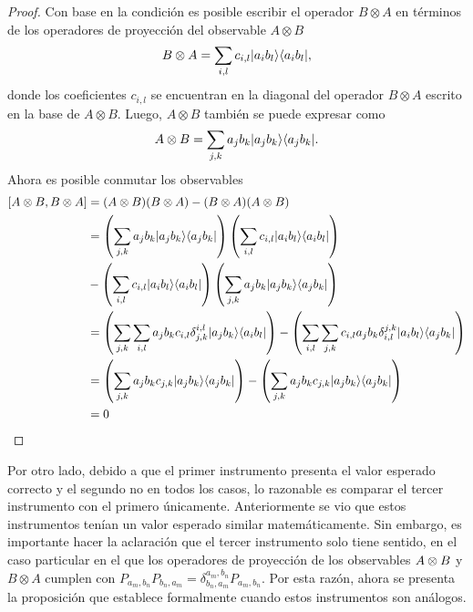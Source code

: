 \begin{proof}
    Con base en la condición es posible escribir el operador $B\otimes A$  en términos de los operadores de proyección del observable $A\otimes B$ \[ B\otimes A = \sum_{i,l} c_{i,l} |a_{i}b_{l}\rangle \langle a_i b_l|,\] donde los coeficientes $c_{i,l}$ se encuentran en la diagonal del operador $B\otimes A$ escrito en la base de $A\otimes B$. Luego, $A\otimes B $ también se puede expresar como \[A\otimes B= \sum_{j,k} a_j b_k |a_{j}b_{k}\rangle \langle a_j b_k|.\] Ahora es posible conmutar los observables \[\begin{split}
        [A\otimes B,B \otimes A]&= (A\otimes B) (B\otimes A)-(B\otimes A) (A\otimes B)\\
        &=\left(\sum_{j,k} a_j b_k |a_{j}b_{k}\rangle \langle a_j b_k|\right)\left(\sum_{i,l} c_{i,l} |a_{i}b_{l}\rangle \langle a_i b_l|\right)\\
		&-\left( \sum_{i,l} c_{i,l} |a_{i}b_{l}\rangle \langle a_i b_l|\right)\left(\sum_{j,k} a_j b_k |a_{j}b_{k}\rangle \langle a_j b_k|\right)\\
		&=\left(\sum_{j,k} \sum_{i,l} a_j b_k  c_{i,l} \delta_{j,k}^{i,l}|a_{j}b_{k}\rangle \langle a_i b_l|\right)-\left( \sum_{i,l} \sum_{j,k} c_{i,l} a_j b_k \delta_{i,l}^{j,k}|a_{i}b_{l}\rangle \langle a_j b_k|\right)\\
		&=\left(\sum_{j,k}  a_j b_k  c_{j,k} |a_{j}b_{k}\rangle \langle a_j b_k|\right)-\left( \sum_{j,k} a_j b_k  c_{j,k} |a_{j}b_{k}\rangle \langle a_j b_k|\right)\\
		&=0
	\end{split}\]

\end{proof}



Por otro lado, debido a que el primer instrumento presenta el valor esperado
correcto y el segundo no en todos los casos, lo razonable es comparar el tercer
instrumento con el primero únicamente. Anteriormente se vio que estos
instrumentos tenían un valor esperado similar matemáticamente. Sin embargo, es
importante hacer la aclaración que el tercer instrumento solo tiene sentido, en
el caso particular en el que los operadores de proyección de los observables
$A\otimes B$ y $B\otimes A$ cumplen con
$P_{a_m,b_n}P_{b_n,a_m}=\delta_{b_n,a_m}^{a_m,b_n}P_{a_m,b_n}$. Por esta razón,
ahora se presenta la proposición que establece formalmente cuando estos
instrumentos son análogos.

